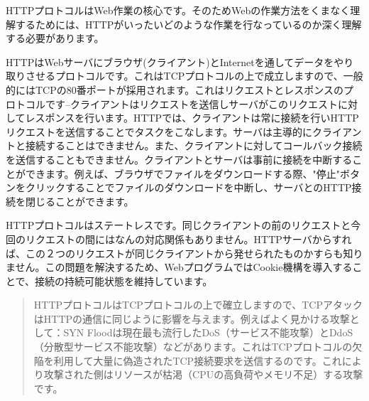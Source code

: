 HTTPプロトコルはWeb作業の核心です。そのためWebの作業方法をくまなく理解するためには、HTTPがいったいどのような作業を行なっているのか深く理解する必要があります。

HTTPはWebサーバにブラウザ(クライアント)とInternetを通してデータをやり取りさせるプロトコルです。これはTCPプロトコルの上で成立しますので、一般的にはTCPの80番ポートが採用されます。これはリクエストとレスポンスのプロトコルです--クライアントはリクエストを送信しサーバがこのリクエストに対してレスポンスを行います。HTTPでは、クライアントは常に接続を行いHTTPリクエストを送信することでタスクをこなします。サーバは主導的にクライアントと接続することはできません。また、クライアントに対してコールバック接続を送信することもできません。クライアントとサーバは事前に接続を中断することができます。例えば、ブラウザでファイルをダウンロードする際、"停止"ボタンをクリックすることでファイルのダウンロードを中断し、サーバとのHTTP接続を閉じることができます。

HTTPプロトコルはステートレスです。同じクライアントの前のリクエストと今回のリクエストの間にはなんの対応関係もありません。HTTPサーバからすれば、この２つのリクエストが同じクライアントから発せられたものかすらも知りません。この問題を解決するため、WebプログラムではCookie機構を導入することで、接続の持続可能状態を維持しています。

\begin{quote}
HTTPプロトコルはTCPプロトコルの上で確立しますので、TCPアタックはHTTPの通信に同じように影響を与えます。例えばよく見かける攻撃として：SYN Floodは現在最も流行したDoS（サービス不能攻撃）とDdoS（分散型サービス不能攻撃）などがあります。これはTCPプロトコルの欠陥を利用して大量に偽造されたTCP接続要求を送信するのです。これにより攻撃された側はリソースが枯渇（CPUの高負荷やメモリ不足）する攻撃です。
\end{quote}
